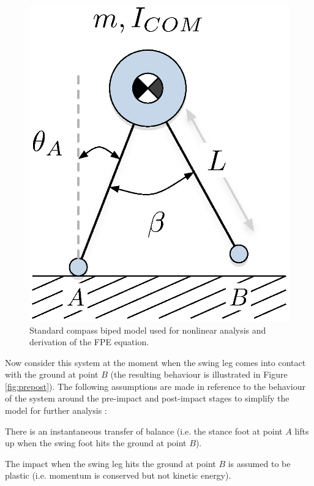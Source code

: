 \begin{figure}[!b]
	\centering
    \includegraphics[scale=0.75]{fig/fpe/compassbiped.eps}
  	\caption{Standard compass biped model used for nonlinear analysis  and derivation of the FPE equation.}
	\label{fig:compass}
\end{figure}

Now consider this system at the moment when the swing leg comes into contact with the ground at point $B$ (the resulting behaviour is illustrated in Figure \ref{fig:prepost}). The following assumptions are made in reference to the behaviour of the system around the pre-impact and post-impact stages to simplify the model for further analysis \cite{Wight:2008vt}: 

\hrulefill

\begin{assumption}
	There is an instantaneous transfer of balance (i.e. the stance foot at point $A$ lifts up when the swing foot hits the ground at point $B$).  
\end{assumption}

\begin{assumption}
	The impact when the swing leg hits the ground at point $B$ is assumed to be plastic (i.e. momentum is conserved but not kinetic energy). 
\end{assumption}

